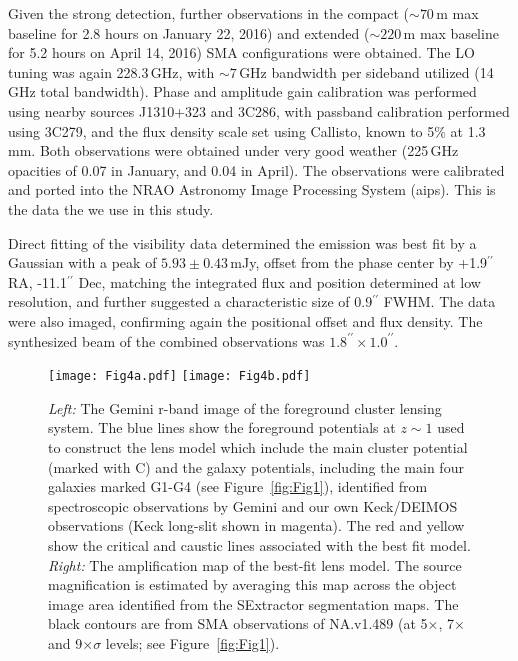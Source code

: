 \documentclass[iop,apj,useAMS,usenatbib]{emulateapj-rtx4}
\begin{document}
Given the strong detection, further observations in the compact ($\sim
70$\,m max baseline for 2.8 hours on January 22, 2016) and extended ($\sim
220$\,m max baseline for 5.2 hours on April 14, 2016) SMA
configurations were obtained. The LO tuning was again 228.3\,GHz, with
$\sim 7$\,GHz bandwidth per sideband utilized (14\,GHz total
bandwidth). Phase and amplitude gain calibration was performed using
nearby sources J1310+323 and 3C286, with passband calibration
performed using 3C279, and the flux density scale set using Callisto,
known to 5\% at 1.3\,mm. Both observations were obtained under very good
weather (225\,GHz opacities of 0.07 in January, and 0.04 in April). The
observations were calibrated and ported into the NRAO Astronomy Image
Processing System ({\sc aips}). This is the data the we use in this
study.

Direct fitting of the visibility data determined the emission was best
fit by a Gaussian with a peak of $5.93\pm 0.43$\,mJy, offset from the
phase center by +1.9$^{\prime\prime}$ RA, -11.1$^{\prime\prime}$ Dec,
matching the integrated flux and
position determined at low resolution, and further suggested a
characteristic size of 0.9$^{\prime\prime}$ FWHM. The data were also imaged,
confirming again the positional offset and flux density. The
synthesized beam of the combined observations was $1.8^{\prime\prime}
\times 1.0^{\prime\prime}$.

\begin{figure*}[th]
\begin{center}
\texttt{[image: Fig4a.pdf]}
\texttt{[image: Fig4b.pdf]}
\caption{{\it Left:} The Gemini r-band image of the foreground cluster lensing
  system. The blue lines show the foreground potentials at $z \sim 1$ used to construct the
lens model which include the main cluster potential (marked with C)
and the galaxy potentials, including the main four galaxies marked
G1-G4 (see Figure~\ref{fig:Fig1}), identified from spectroscopic observations by
Gemini \citep{Stanford2014} and our own Keck/DEIMOS observations (Keck
long-slit shown in magenta). The
red and yellow show the critical and caustic lines associated with the
best fit model. {\it Right:} The amplification map of the best-fit lens
model. The source magnification is estimated by averaging this map
across the object image area identified from the {\sc SExtractor} segmentation
maps. The black contours are from SMA
observations of NA.v1.489 (at 5$\times$, 7$\times$ and 9$\times
\sigma$ levels; see Figure~\ref{fig:Fig1}).}
\label{fig:Fig4}
\end{center}
\end{figure*}
\end{document}
